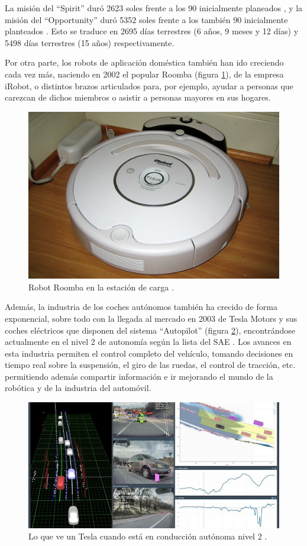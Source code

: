 La misión del ``Spirit'' duró 2623 soles frente a los 90 inicialmente planeados \cite{SpiritRover2020a},
y la misión del ``Opportunity'' duró 5352 soles frente a los también 90 inicialmente planteados \cite{OpportunityRover2020a}.
Esto se traduce en 2695 días terrestres (6 años, 9 meses y 12 días) y 5498 días terrestres (15 años)
respectivamente.

Por otra parte, los robots de aplicación doméstica también han ido creciendo cada vez más,
naciendo en 2002 el popular Roomba (figura \ref{fig:roomba}), de la empresa iRobot, o distintos brazos articulados
para, por ejemplo, ayudar a personas que carezcan de dichos miembros o asistir a personas
mayores en sus hogares.

\begin{figure}[H]
    \centering
    \includegraphics[width=.5\linewidth]{pictures/Roomba3g.jpg}
    \caption{Robot Roomba en la estación de carga \cite{HistoryRobots2020a}.}
    \label{fig:roomba}
\end{figure}

Además, la industria de los coches autónomos también ha crecido de forma exponencial,
sobre todo con la llegada al mercado en 2003 de Tesla Motors y sus coches eléctricos
que disponen del sistema ``Autopilot'' (figura \ref{fig:ap}), encontrándose actualmente en el nivel 2 de
autonomía según la lista del SAE \cite{baldwinTeslaVideoShows2020a}\cite{TeslaFullSelfdrivinga}.
Los avances en esta industria permiten el control completo del vehículo, tomando
decisiones en tiempo real sobre la suspensión, el giro de las ruedas, el control de tracción,
etc. permitiendo además compartir información e ir mejorando el mundo de la robótica
y de la industria del automóvil.

\begin{figure}[H]
    \centering
    \includegraphics[width=\linewidth]{pictures/tesla-automation.jpeg}
    \caption{Lo que ve un Tesla cuando está en conducción autónoma nivel 2 \cite{baldwinTeslaVideoShows2020a}.}
    \label{fig:ap}
\end{figure}

